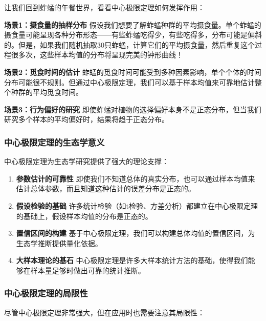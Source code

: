 \documentclass[
]{book}
\begin{document}
让我们回到蚱蜢的午餐世界，看看中心极限定理如何发挥作用：

\textbf{场景1：摄食量的抽样分布}
假设我们想要了解蚱蜢种群的平均摄食量。单个蚱蜢的摄食量可能呈现各种分布形态------有些蚱蜢吃得少，有些吃得多，分布可能是偏斜的。但是，如果我们随机抽取30只蚱蜢，计算它们的平均摄食量，然后重复这个过程很多次，这些样本均值的分布将呈现完美的钟形曲线！

\textbf{场景2：觅食时间的估计}
蚱蜢的觅食时间可能受到多种因素影响，单个个体的时间分布可能很不规则。但通过中心极限定理，我们可以基于样本均值来可靠地估计整个种群的平均觅食时间。

\textbf{场景3：行为偏好的研究}
即使蚱蜢对植物的选择偏好本身不是正态分布，但当我们研究多个样本的平均偏好时，结果将趋于正态分布。

\hypertarget{ux4e2dux5fc3ux6781ux9650ux5b9aux7406ux7684ux751fux6001ux5b66ux610fux4e49}{%
\subsubsection{中心极限定理的生态学意义}\label{ux4e2dux5fc3ux6781ux9650ux5b9aux7406ux7684ux751fux6001ux5b66ux610fux4e49}}

中心极限定理为生态学研究提供了强大的理论支撑：

\begin{enumerate}
\def\labelenumi{\arabic{enumi}.}
\item
  \textbf{参数估计的可靠性}
  即使我们不知道总体的真实分布，也可以通过样本均值来估计总体参数，而且知道这种估计的误差分布是正态的。
\item
  \textbf{假设检验的基础}
  许多统计检验（如t检验、方差分析）都建立在中心极限定理的基础上，假设样本均值的分布是正态的。
\item
  \textbf{置信区间的构建}
  基于中心极限定理，我们可以构建总体均值的置信区间，为生态学推断提供量化依据。
\item
  \textbf{大样本理论的基石}
  中心极限定理是许多大样本统计方法的基础，使得我们能够在样本量足够时做出可靠的统计推断。
\end{enumerate}

\hypertarget{ux4e2dux5fc3ux6781ux9650ux5b9aux7406ux7684ux5c40ux9650ux6027}{%
\subsubsection{中心极限定理的局限性}\label{ux4e2dux5fc3ux6781ux9650ux5b9aux7406ux7684ux5c40ux9650ux6027}}

尽管中心极限定理非常强大，但在应用时也需要注意其局限性：
\end{document}
